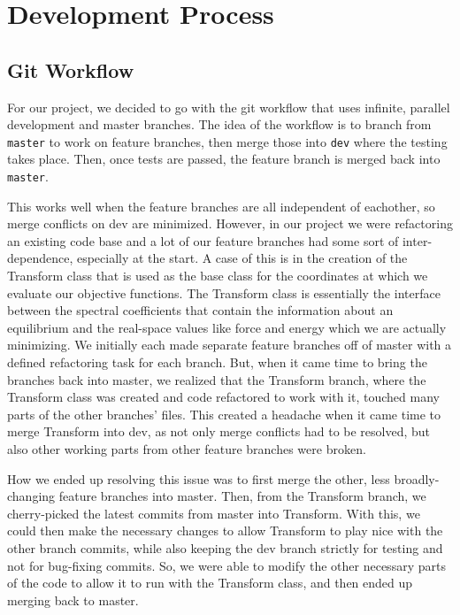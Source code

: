 \documentclass{article}
\begin{document}
\section{Development Process}

\subsection{Git Workflow}

For our project, we decided to go with the git workflow that uses infinite, parallel development and master branches.
The idea of the workflow is to branch from \texttt{master} to work on feature branches, then merge those into \texttt{dev} where the testing takes place.
Then, once tests are passed, the feature branch is merged back into \texttt{master}.

This works well when the feature branches are all independent of eachother, so merge conflicts on dev are minimized.
However, in our project we were refactoring an existing code base and a lot of our feature branches had some sort of inter-dependence, especially at the start.
A case of this is in the creation of the Transform class that is used as the base class for the coordinates at which we evaluate our objective functions.
The Transform class is essentially the interface between the spectral coefficients that contain the information about an equilibrium and the real-space values like force and energy which we are actually minimizing.
We initially each made separate feature branches off of master with a defined refactoring task for each branch.
But, when it came time to bring the branches back into master, we realized that the Transform branch, where the Transform class was created and code refactored to work with it, touched many parts of the other branches' files.
This created a headache when it came time to merge Transform into dev, as not only merge conflicts had to be resolved, but also other working parts from other feature branches were broken.

How we ended up resolving this issue was to first merge the other, less broadly-changing feature branches into master.
Then, from the Transform branch, we cherry-picked the latest commits from master into Transform.
With this, we could then make the necessary changes to allow Transform to play nice with the other branch commits, while also keeping the dev branch strictly for testing and not for bug-fixing commits.
So, we were able to modify the other necessary parts of the code to allow it to run with the Transform class, and then ended up merging back to master.
\end{document}
